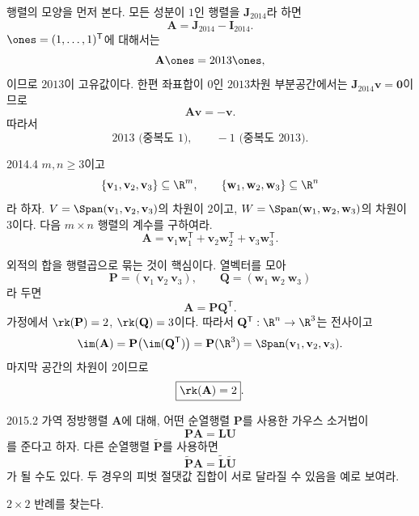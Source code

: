 \begin{solution}
행렬의 모양을 먼저 본다. 모든 성분이 $1$인 행렬을 $\mathbf J_{2014}$라 하면
\[
\mathbf A=\mathbf J_{2014}-\mathbf I_{2014}.
\]
$\ones=(1,\ldots,1)^{\mathsf T}$에 대해서는
\[
\mathbf A\ones=2013\ones,
\]
이므로 $2013$이 고유값이다. 한편 좌표합이 $0$인 $2013$차원 부분공간에서는 $\mathbf J_{2014}\mathbf v=\mathbf0$이므로
\[
\mathbf A\mathbf v=-\mathbf v.
\]
따라서
\[
\boxed{2013\text{ (중복도 }1),\qquad -1\text{ (중복도 }2013)}.
\]
\end{solution}

\begin{pastproblem}{2014.4}
$m,n\ge3$이고
\[
\{\mathbf v_1,\mathbf v_2,\mathbf v_3\}\subseteq\R^m,
\qquad
\{\mathbf w_1,\mathbf w_2,\mathbf w_3\}\subseteq\R^n
\]
라 하자. $V=\Span(\mathbf v_1,\mathbf v_2,\mathbf v_3)$의 차원이 $2$이고, $W=\Span(\mathbf w_1,\mathbf w_2,\mathbf w_3)$의 차원이 $3$이다. 다음 $m\times n$ 행렬의 계수를 구하여라.
\[
\mathbf A=\mathbf v_1\mathbf w_1^{\mathsf T}+\mathbf v_2\mathbf w_2^{\mathsf T}+\mathbf v_3\mathbf w_3^{\mathsf T}.
\]
\end{pastproblem}

\begin{solution}
외적의 합을 행렬곱으로 묶는 것이 핵심이다. 열벡터를 모아
\[
\mathbf P=(\mathbf v_1\ \mathbf v_2\ \mathbf v_3),\qquad
\mathbf Q=(\mathbf w_1\ \mathbf w_2\ \mathbf w_3)
\]
라 두면
\[
\mathbf A=\mathbf P\mathbf Q^{\mathsf T}.
\]
가정에서 $\rk(\mathbf P)=2$, $\rk(\mathbf Q)=3$이다. 따라서 $\mathbf Q^{\mathsf T}:\R^n\to\R^3$는 전사이고
\[
\im(\mathbf A)
=\mathbf P\bigl(\im(\mathbf Q^{\mathsf T})\bigr)
=\mathbf P(\R^3)
=\Span(\mathbf v_1,\mathbf v_2,\mathbf v_3).
\]
마지막 공간의 차원이 $2$이므로
\[
\boxed{\rk(\mathbf A)=2}.
\]
\end{solution}

\begin{pastproblem}{2015.2}
가역 정방행렬 $\mathbf A$에 대해, 어떤 순열행렬 $\mathbf P$를 사용한 가우스 소거법이
\[
\mathbf P\mathbf A=\mathbf L\mathbf U
\]
를 준다고 하자. 다른 순열행렬 $\widetilde{\mathbf P}$를 사용하면
\[
\widetilde{\mathbf P}\mathbf A=\widetilde{\mathbf L}\widetilde{\mathbf U}
\]
가 될 수도 있다. 두 경우의 피벗 절댓값 집합이 서로 달라질 수 있음을 예로 보여라.
\begin{hint}
$2\times2$ 반례를 찾는다.
\end{hint}
\end{pastproblem}

